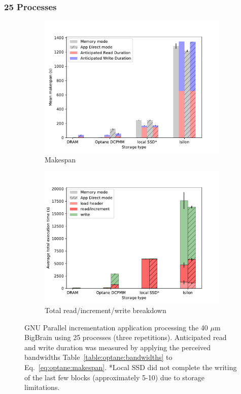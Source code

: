 \subsubsection{25 Processes}


\begin{figure}
    \begin{subfigure}{0.5\textwidth}
        \centering
        \includegraphics[width=\columnwidth]{figures/optane/makespan-real-40bb_25cpus.pdf}
        \caption{Makespan}\label{fig:optane:makespan-25cpus}
    \end{subfigure}
    \begin{subfigure}{0.5\textwidth}
        \centering
        \includegraphics[width=\columnwidth]{figures/optane/stacked-real-40bb_25cpus.pdf}
        \caption{Total read/increment/write breakdown}\label{fig:optane:stacked-25cpus}
    \end{subfigure}
    \captionsetup{belowskip=-10pt}
    \caption{GNU Parallel incrementation application processing the 40 $\mu$m
    BigBrain using 25 processes (three repetitions). Anticipated read and write
    duration was measured by applying the perceived bandwidths
    Table~\ref{table:optane:bandwidths} to Eq.~\ref{eq:optane:makespan}. *Local SSD did not
    complete the writing of the last few blocks (approximately 5-10) due to
    storage limitations.}
\end{figure}

